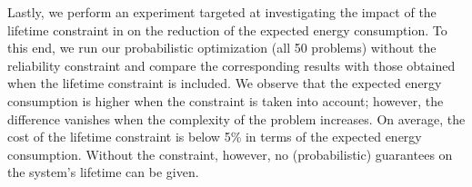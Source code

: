 Lastly, we perform an experiment targeted at investigating the impact of the
lifetime constraint in  on the reduction of
the expected energy consumption. To this end, we run our probabilistic
optimization (all 50 problems) without the reliability constraint and compare
the corresponding results with those obtained when the lifetime constraint is
included. We observe that the expected energy consumption is higher when the
constraint is taken into account; however, the difference vanishes when the
complexity of the problem increases. On average, the cost of the lifetime
constraint is below 5\% in terms of the expected energy consumption. Without the
constraint, however, no (probabilistic) guarantees on the system's lifetime can
be given.
